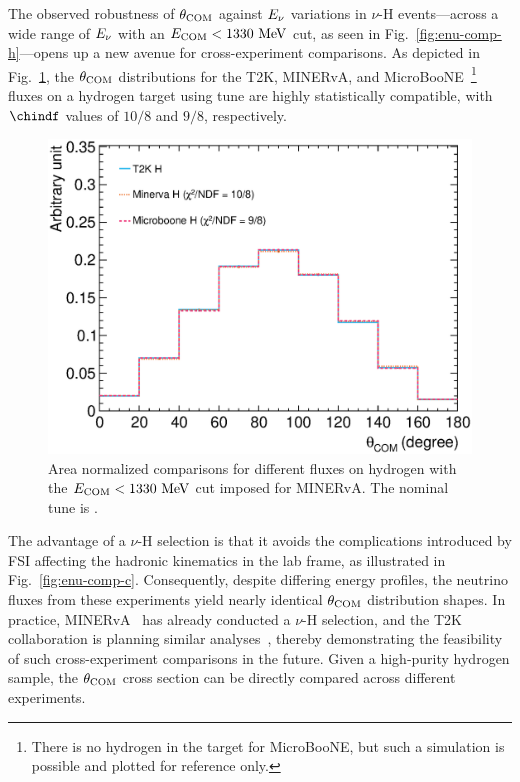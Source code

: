      The observed robustness of $\theta_{\textrm{COM}}$ against $E_{\nu}$ variations in $\nu$-H events—across a wide range of $E_{\nu}$ with an $E_{\textrm{COM}} < 1330~\textrm{MeV}$ cut, as seen in Fig.~\ref{fig:enu-comp-h}—opens up a new avenue for cross-experiment comparisons.
     As depicted in Fig.~\ref{fig:flux-comp}, the $\theta_{\textrm{COM}}$ distributions for the T2K, MINERvA, and MicroBooNE~\footnote{There is no hydrogen in the target for MicroBooNE, but such a simulation is possible and plotted for reference only.} fluxes on a hydrogen target using tune \gZero are highly statistically compatible, with $\chindf$ values of $10/8$ and $9/8$, respectively.
     \begin{figure}
     \includegraphics[width=\scfigwid\textwidth]{figures/COM/anorm-flux-9bin-wcut_da_tan.eps}
     \caption{Area normalized comparisons for different fluxes on hydrogen with the $E_{\textrm{COM}}<1330~\textrm{MeV}$ cut imposed for MINERvA. The nominal tune is \gZero.}
     \label{fig:flux-comp}
     \end{figure}
     The advantage of a $\nu$-H selection is that it avoids the complications introduced by FSI affecting the hadronic kinematics in the lab frame, as illustrated in Fig.~\ref{fig:enu-comp-c}.
     Consequently, despite differing energy profiles, the neutrino fluxes from these experiments yield nearly identical $\theta_{\textrm{COM}}$ distribution shapes.
     In practice, MINERvA~\cite{MINERvA:2023avz} has already conducted a $\nu$-H selection, and the T2K collaboration is planning similar analyses~\cite{Lu:2015hea}, thereby demonstrating the feasibility of such cross-experiment comparisons in the future.
     Given a high‐purity hydrogen sample, the $\theta_{\textrm{COM}}$ cross section can be directly compared across different experiments.

